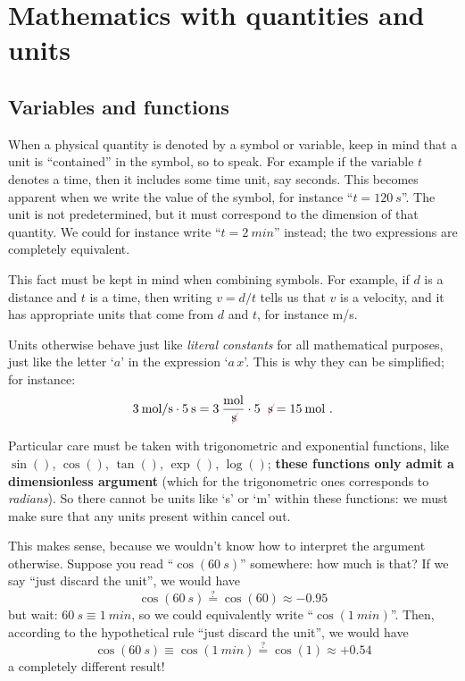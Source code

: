 \documentclass[a4paper,12pt,%
onecolumn,oneside,%
british%
]{memoir}
\renewcommand*{\|}[1][]{\nonscript\:#1\vert\nonscript\:\mathopen{}}
\begin{document}
\section{Mathematics with quantities and units}
\label{sec:variables_units}

\subsection{Variables and functions}
\label{sec:variables}

When a physical quantity is denoted by a symbol or variable, keep in mind that a unit is \enquote{contained} in the symbol, so to speak. For example if the variable $t$ denotes a time, then it includes some time unit, say seconds. This becomes apparent when we write the value of the symbol, for instance \enquote{$t=\qty{120}{s}$}. The unit is not predetermined, but it must correspond to the dimension of that quantity. We could for instance write \enquote{$t=\qty{2}{min}$} instead; the two expressions are completely equivalent.

This fact must be kept in mind when combining symbols. For example, if $d$ is a distance and $t$ is a time, then writing $v=d/t$ tells us that $v$ is a velocity, and it has appropriate units that come from $d$ and $t$, for instance \unit{m/s}.

Units otherwise behave just like \emph{literal constants} for all mathematical purposes, just like the letter \enquote*{$a$} in the expression \enquote*{$a\, x$}. This is why they can be simplified; for instance:
\begin{equation*}
  \qty{3}{mol/s} \cdot \qty{5}{s} =
  \num{3}\:\frac{\unit{mol}}{\mathcolor{red}{\not}\!\unit{s}} \cdot \num{5}\:\mathcolor{red}{\not}\!\unit{s} = \qty{15}{mol} \ .
\end{equation*}

\medskip

Particular care must be taken with trigonometric and exponential functions, like $\sin()$, $\cos()$, $\tan()$, $\exp()$, $\log()$; \textbf{these functions only admit a dimensionless argument} (which for the trigonometric ones corresponds to \emph{radians}). So there cannot be units like \enquote*{\unit{s}} or \enquote*{\unit{m}} within these functions: we must make sure that any units present within cancel out.

This makes sense, because we wouldn't know how to interpret the argument otherwise. Suppose you read \enquote{$\cos(\qty{60}{s})$} somewhere: how much is that? If we say \enquote{just discard the unit}, we would have
\begin{equation*}
  \cos(\qty{60}{s}) \stackrel{?}{=} \cos(60) \approx -0.95
\end{equation*}
but wait: $\qty{60}{s}\equiv\qty{1}{min}$, so we could equivalently write \enquote{$\cos(\qty{1}{min})$}. Then, according to the hypothetical rule \enquote{just discard the unit}, we would have
\begin{equation*}
  \cos(\qty{60}{s}) \equiv \cos(\qty{1}{min})\stackrel{?}{=} \cos(1) \approx +0.54
\end{equation*}
a completely different result!
\end{document}
